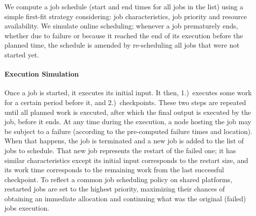 We compute a job schedule (start and end times for all jobs in the list) using
a simple first-fit strategy considering: job characteristics, job priority and
resource availability.  We simulate online scheduling; whenever a job
prematurely ends, whether due to failure or because it reached the end of its
execution before the planned time, the schedule is amended by re-scheduling all
jobs that were not started yet.

\paragraph*{Execution Simulation}

Once a job is started, it executes its initial input. It then, 1.)~executes
some work for a certain period before it, and 2.)~checkpoints. These two steps
are repeated until all planned work is executed, after which the final output
is executed by the job, before it ends.  At any time during the execution, a
node hosting the job may be subject to a failure (according to the pre-computed
failure times and location). When that happens, the job is terminated and a new
job is added to the list of jobs to schedule. That new job represents the
restart of the failed one; it has similar characteristics except its initial
input corresponds to the restart size, and its work time corresponds to the
remaining work from the last successful checkpoint. To reflect a common job
scheduling policy on shared platforms, restarted jobs are set to the highest
priority, maximizing their chances of obtaining an immediate allocation and
continuing what was the original (failed) jobs execution.

